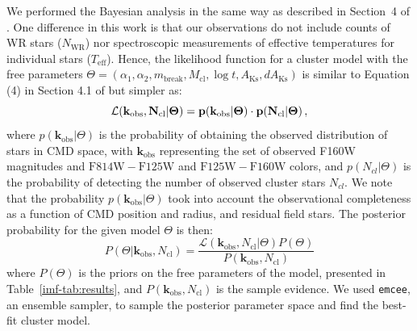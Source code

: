 \documentclass[12pt]{ucsddissertation}
\newcommand{\AKs}{A_{\mathrm{Ks}}}
\begin{document}
\begin{CJK*}{UTF8}{gbsn}
We performed the Bayesian analysis in the same way as described in Section~4 of \citet{Hosek-2019}.  One difference in this work is that our observations do not include counts of WR stars ($N_\mathrm{WR}$) nor spectroscopic measurements of effective temperatures for individual stars ($T_\mathrm{eff}$). Hence, the likelihood function for a cluster model with the free parameters $\Theta = (\alpha_1, \alpha_2, m_\mathrm{break}, M_\mathrm{cl}, \log t, \AKs, d\AKs)$ is similar to Equation (4) in Section 4.1 of \citet{Hosek-2019} but simpler as:
\begin{equation}
\mathcal{L}(\bf{k}_\mathrm{obs}, N_\mathrm{cl} | \Theta) = p(\bf{k}_\mathrm{obs} | \Theta) \cdot p(N_\mathrm{cl} | \Theta)\,,
\end{equation}
where $p(\mathbf{k}_\mathrm{obs} | \Theta)$ is the probability of obtaining the observed distribution of stars in CMD space, with $\mathbf{k}_\mathrm{obs}$ representing the set of observed F160W magnitudes and $\mathrm{F814W} - \mathrm{F125W}$ and $\mathrm{F125W} - \mathrm{F160W}$ colors, and $p(N_{cl} | \Theta)$ is the probability of detecting the number of observed cluster stars $N_{cl}$. We note that the probability $p(\mathbf{k}_\mathrm{obs} | \Theta)$ took into account the observational completeness as a function of CMD position and radius, and residual field stars. The posterior probability for the given model $\Theta$ is then:
\begin{equation}
P(\Theta | \mathbf{k}_\mathrm{obs}, N_\mathrm{cl}) = \frac{\mathcal{L}(\mathbf{k}_\mathrm{obs}, N_\mathrm{cl} | \Theta) P(\Theta)}{P(\mathbf{k}_\mathrm{obs}, N_\mathrm{cl})}
\end{equation}
where $P(\Theta)$ is the priors on the free parameters of the model, presented in Table~\ref{imf-tab:results}, and $P(\mathbf{k}_\mathrm{obs}, N_\mathrm{cl})$ is the sample evidence. We used \texttt{emcee}, an ensemble sampler, to sample the posterior parameter space and find the best-fit cluster model. 




\end{CJK*}
\end{document}
